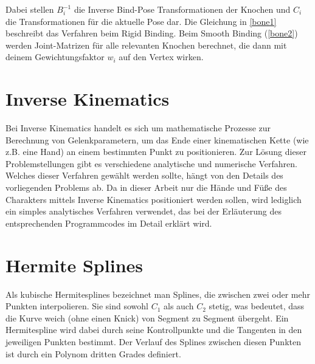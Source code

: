 Dabei stellen $B_{i}^{-1}$ die Inverse Bind-Pose Transformationen der Knochen und $C_{i}$ die Transformationen für die aktuelle Pose dar. Die Gleichung in \ref{bone1} beschreibt das Verfahren beim Rigid Binding. Beim Smooth Binding (\ref{bone2}) werden Joint-Matrizen für alle relevanten Knochen berechnet, die dann mit deinem Gewichtungsfaktor $w_{i}$ auf den Vertex wirken.

\section{Inverse Kinematics}
Bei Inverse Kinematics handelt es sich um mathematische Prozesse zur Berechnung von Gelenkparametern, um das Ende einer kinematischen Kette (wie z.B. eine Hand) an einem bestimmten Punkt zu positionieren. Zur Lösung dieser Problemstellungen gibt es verschiedene analytische und numerische Verfahren. Welches dieser Verfahren gewählt werden sollte, hängt von den Details des vorliegenden Problems ab. Da in dieser Arbeit nur die Hände und Füße des Charakters mittels Inverse Kinematics positioniert werden sollen, wird lediglich ein simples analytisches Verfahren verwendet, das bei der Erläuterung des entsprechenden Programmcodes im Detail erklärt wird.

\section{Hermite Splines}
Als kubische Hermitesplines bezeichnet man Splines, die zwischen zwei oder mehr Punkten interpolieren. Sie sind sowohl $C_1$ als auch $C_2$ stetig, was bedeutet, dass die Kurve weich (ohne einen Knick) von Segment zu Segment übergeht. Ein Hermitespline wird dabei durch seine Kontrollpunkte und die Tangenten in den jeweiligen Punkten bestimmt. Der Verlauf des Splines zwischen diesen Punkten ist durch ein Polynom dritten Grades definiert.